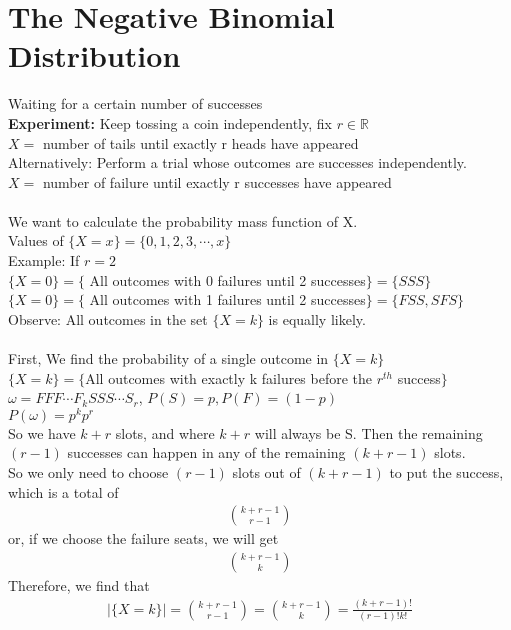 \documentclass[11pt,oneside]{book}
\theoremstyle{break}
\theoremstyle{break}
\newcommand{\example}{\color{green}Example: \color{black}}
\begin{document}
\section[The Negative Binomial Distribution]{The Negative Binomial Distribution}
Waiting for a certain number of successes\\
\textbf{Experiment:} Keep tossing a coin independently, fix $r\in \mathbb{R}$\\
$X=$ number of tails until exactly r heads have appeared\\
Alternatively: Perform a trial whose outcomes are successes independently.\\ 
$X=$ number of failure until exactly r successes have appeared\\
\hfill\\
We want to calculate the probability mass function of X.\\
Values of $\{X=x\}=\{0,1,2,3,\cdots,x\}$\\
\example If $r=2$\\
$\{X=0\}=\{$ All outcomes with 0 failures until 2 successes$\}=\{SSS\}$\\
$\{X=0\}=\{$ All outcomes with 1 failures until 2 successes$\}=\{FSS,SFS\}$\\
Observe: All outcomes in the set $\{X=k\}$ is equally likely.\\
\hfill\\
First, We find the probability of a single outcome in $\{X=k\}$\\
$\{X=k\}=\{$All outcomes with exactly k failures before the $r^{th}$ success$\}$\\
$\omega = FFF\cdots F_kSSS\cdots S_r$, $P(S)=p,P(F)=(1-p)$\\
$P(\omega)=p^{k}p^{r}$\\
So we have $k+r$ slots, and where $k+r$ will always be S. Then the remaining $(r-1)$ successes can happen in any of the remaining $(k+r-1)$ slots. \\
So we only need to choose $(r-1)$ slots out of $(k+r-1)$ to put the success, which is a total of\begin{align*}
\binom{k+r-1}{r-1}
\end{align*}
or, if we choose the failure seats, we will get \begin{align*}
\binom{k+r-1}{k}
\end{align*}
Therefore, we find that \begin{align*}
|\{X=k\}|=\binom{k+r-1}{r-1}=\binom{k+r-1}{k}=\frac{(k+r-1)!}{(r-1)!k!}
\end{align*}
\end{document}
